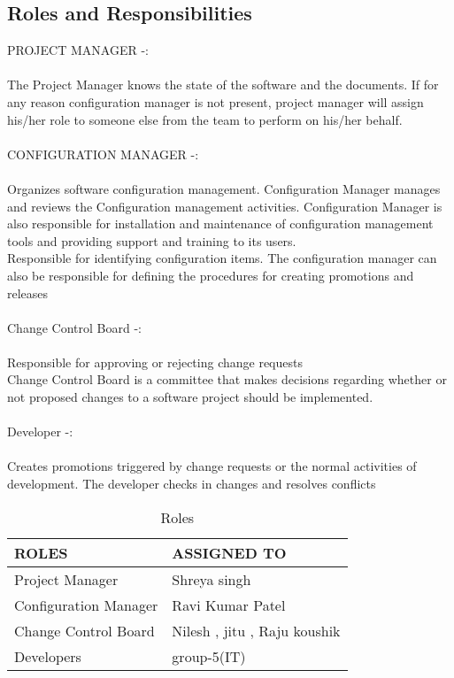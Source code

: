 \documentclass[]{article}
\begin{document}
\subsection{Roles and Responsibilities\\}
PROJECT MANAGER -:\\\\ The Project Manager knows the state of the software and the documents. If for any reason configuration manager is not present, project manager will assign his/her role to someone else from the team to perform on his/her behalf.
\\\\
CONFIGURATION MANAGER -:\\\\ Organizes software configuration management. Configuration Manager manages and reviews the Configuration management activities. Configuration Manager is also responsible for installation and maintenance of configuration management tools and providing support and training to its users.\\
Responsible for identifying configuration items. The configuration
manager can also be responsible for defining the procedures for creating
promotions and releases\\\\
Change Control Board -:\\\\Responsible for approving or rejecting change requests\\ Change Control Board is a committee that makes decisions regarding whether or not proposed changes to a software project should be implemented.
\\\\
Developer -:\\\\
Creates promotions triggered by change requests or the normal activities
of development. The developer checks in changes and resolves conflicts



\begin{table}[]
\centering
\caption{Roles}
\label{my-label}
\begin{tabular}{|l|l|}
\hline
ROLES  & ASSIGNED TO                                     \\ \hline
Project Manager  & Shreya singh                      \\ \hline
Configuration Manager & Ravi Kumar Patel \\ \hline
Change Control Board & Nilesh , jitu , Raju koushik                   \\ \hline
Developers & group-5(IT)                        \\ \hline
                            
\end{tabular}
\end{table}
\end{document}
